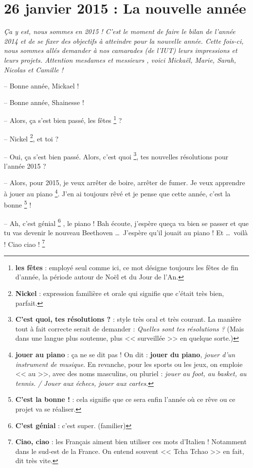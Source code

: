 \documentclass[11pt, french]{report}
\begin{document}
\chapter{26 janvier 2015 : La nouvelle année}

\textit{Ça y est, nous sommes en 2015 ! C’est le moment de faire le bilan
  de l’année 2014 et de se fixer des objectifs à atteindre pour la nouvelle
  année. Cette fois-ci, nous sommes allés demander à nos camarades (de l’IUT)
  leurs impressions et leurs projets. Attention mesdames et messieurs ,
  voici Mickaël, Marie, Sarah, Nicolas et Camille !}

\vfill

-- Bonne année, Mickael !

-- Bonne année, Shainesse !

-- Alors, ça s'est bien passé, les fêtes \footnote{\textbf{les fêtes} : employé
  seul comme ici, ce mot désigne toujours les fêtes de fin d'année, la période
  autour de Noël et du Jour de l'An.} ?

-- Nickel \footnote{\textbf{Nickel} : expression familière et orale qui
  signifie que c'était très bien, parfait.}, et toi ?

-- Oui, ça s'est bien passé. Alors, c'est quoi
\footnote{\textbf{C'est quoi, tes résolutions ?} : style très oral et très
  courant. La manière tout à fait correcte serait de demander : \textit{Quelles
  sont tes résolutions ?} (Mais dans une langue plus soutenue, plus
<< surveillée >> en quelque sorte.)}, tes nouvelles résolutions pour l'année 2015 ?

-- Alors, pour 2015, je veux arrêter de boire, arrêter de fumer. Je veux
apprendre à jouer au piano \footnote{\textbf{jouer au piano} : ça ne se dit
  pas ! On dit : \textbf{jouer du piano}, \textit{jouer d'un instrument de
    musique}. En revanche, pour les sports ou les jeux, on emploie << au >>,
avec des noms masculins, ou pluriel : \textit{jouer au foot, au basket, au
tennis. / Jouer aux échecs, jouer aux cartes}.}. J'en ai toujours rêvé et je
pense que cette année, c'est la bonne \footnote{\textbf{C'est la bonne !} :
cela signifie que ce sera enfin l'année où ce rêve ou ce projet va se
réaliser.} !

-- Ah, c'est génial \footnote{\textbf{C'est génial} : c'est super. (familier)}
, le piano ! Bah écoute, j'espère queça va bien se passer et que tu vas
devenir le nouveau Beethoven \ldots\ J'espère qu'il jouait au piano
\footmark[4] ! Et \ldots\ voilà ! Ciao ciao !
\footnote{\textbf{Ciao, ciao} : les Français aiment bien utiliser ces mots
  d'Italien ! Notamment dans le sud-est de la France. On entend souvent
<< Tcha Tchao >> en fait, dit très vite.}
\end{document}

